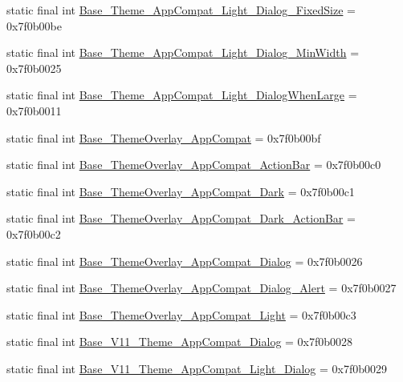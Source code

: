 \begin{CompactItemize}
\item 
static final int \hyperlink{classandroid_1_1support_1_1v4_1_1_r_1_1style_1fed42f1534d59b0ee1bf806446fa31f}{Base\_\-Theme\_\-AppCompat\_\-Light\_\-Dialog\_\-FixedSize} = 0x7f0b00be
\item 
static final int \hyperlink{classandroid_1_1support_1_1v4_1_1_r_1_1style_ea76af16b078699cc8b18b3a87075cd0}{Base\_\-Theme\_\-AppCompat\_\-Light\_\-Dialog\_\-MinWidth} = 0x7f0b0025
\item 
static final int \hyperlink{classandroid_1_1support_1_1v4_1_1_r_1_1style_43644cb059ec5009896aee5329f09629}{Base\_\-Theme\_\-AppCompat\_\-Light\_\-DialogWhenLarge} = 0x7f0b0011
\item 
static final int \hyperlink{classandroid_1_1support_1_1v4_1_1_r_1_1style_8e342a2cf60997d66d4bcffdd3459721}{Base\_\-ThemeOverlay\_\-AppCompat} = 0x7f0b00bf
\item 
static final int \hyperlink{classandroid_1_1support_1_1v4_1_1_r_1_1style_bd1ae01af4c6f3c042413b2529765211}{Base\_\-ThemeOverlay\_\-AppCompat\_\-ActionBar} = 0x7f0b00c0
\item 
static final int \hyperlink{classandroid_1_1support_1_1v4_1_1_r_1_1style_4a5139b03db985ccaf566b769bdc8487}{Base\_\-ThemeOverlay\_\-AppCompat\_\-Dark} = 0x7f0b00c1
\item 
static final int \hyperlink{classandroid_1_1support_1_1v4_1_1_r_1_1style_cc5f31ddddb52f4b646e1c96f4c9b71b}{Base\_\-ThemeOverlay\_\-AppCompat\_\-Dark\_\-ActionBar} = 0x7f0b00c2
\item 
static final int \hyperlink{classandroid_1_1support_1_1v4_1_1_r_1_1style_53513cf050dbaba6fe1d0ec9c02dd512}{Base\_\-ThemeOverlay\_\-AppCompat\_\-Dialog} = 0x7f0b0026
\item 
static final int \hyperlink{classandroid_1_1support_1_1v4_1_1_r_1_1style_c5ca299ab2187172f62937a6b5bfea09}{Base\_\-ThemeOverlay\_\-AppCompat\_\-Dialog\_\-Alert} = 0x7f0b0027
\item 
static final int \hyperlink{classandroid_1_1support_1_1v4_1_1_r_1_1style_3a1e2736e9e57ec9096f6698fa62250d}{Base\_\-ThemeOverlay\_\-AppCompat\_\-Light} = 0x7f0b00c3
\item 
static final int \hyperlink{classandroid_1_1support_1_1v4_1_1_r_1_1style_0fdec94dbb5672777cb8b107950f029f}{Base\_\-V11\_\-Theme\_\-AppCompat\_\-Dialog} = 0x7f0b0028
\item 
static final int \hyperlink{classandroid_1_1support_1_1v4_1_1_r_1_1style_add09734acadd14cdf6a81d58a44f1cf}{Base\_\-V11\_\-Theme\_\-AppCompat\_\-Light\_\-Dialog} = 0x7f0b0029

\end{CompactItemize}
